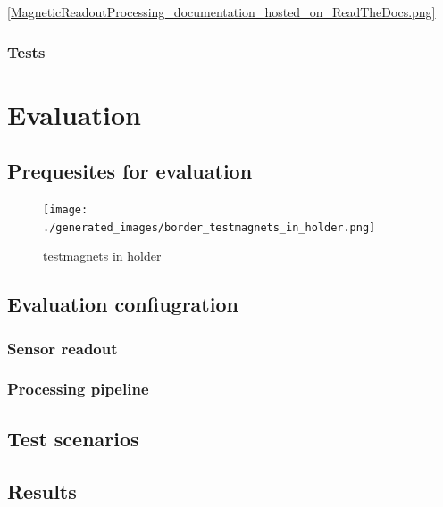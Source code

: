 \cite{ReadTheDocs}

\cite{MagneticReadoutProcessingReadTheDocs}

\ref{MagneticReadoutProcessing_documentation_hosted_on_ReadTheDocs.png}

\hypertarget{tests}{%
\subsection{Tests}\label{tests}}

\hypertarget{evaluation}{%
\chapter{Evaluation}\label{evaluation}}

\hypertarget{prequesites-for-evaluation}{%
\section{Prequesites for evaluation}\label{prequesites-for-evaluation}}

\begin{figure}
\centering
\texttt{[image: ./generated\_images/border\_testmagnets\_in\_holder.png]}
\caption{testmagnets in holder \label{testmagnets_in_holder.png}}
\end{figure}

\hypertarget{evaluation-confiugration}{%
\section{Evaluation confiugration}\label{evaluation-confiugration}}

\hypertarget{sensor-readout}{%
\subsection{Sensor readout}\label{sensor-readout}}

\hypertarget{processing-pipeline}{%
\subsection{Processing pipeline}\label{processing-pipeline}}

\hypertarget{test-scenarios}{%
\section{Test scenarios}\label{test-scenarios}}

\hypertarget{results}{%
\section{Results}\label{results}}


